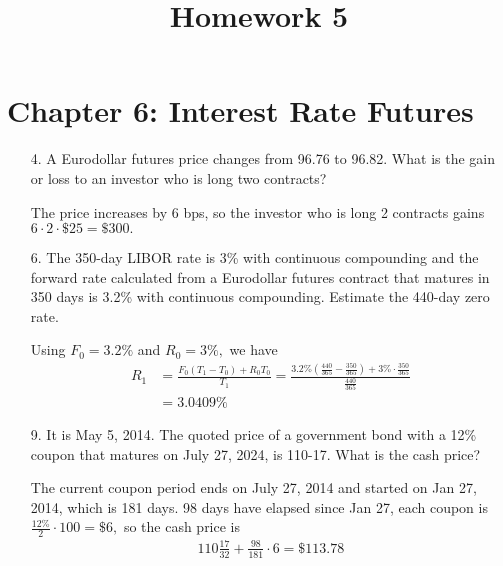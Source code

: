 \documentclass{article}
\begin{document}
\title{Homework 5}
\maketitle
\thispagestyle{fancy}

\section*{Chapter 6: Interest Rate Futures}

\begin{itemize}
	\item[4.] A Eurodollar futures price changes from 96.76 to 96.82. What is the gain or loss to an investor who is long two contracts?
		\begin{soln}
			The price increases by 6 bps, so the investor who is long 2 contracts gains $6\cdot 2\cdot \$25 = \$300.$
		\end{soln}

	\item[6.] The 350-day LIBOR rate is 3\% with continuous compounding and the forward rate calculated from a Eurodollar futures contract that matures in 350 days is 3.2\% with continuous compounding. Estimate the 440-day zero rate.
		\begin{soln}
			Using $F_0=3.2\%$ and $R_0=3\%,$ we have
			\begin{align*}
				R_{1} &= \frac{F_0(T_{1}-T_0)+R_0T_0}{T_{1}} = \frac{3.2\%\left( \frac{440}{365}-\frac{350}{365} \right) + 3\%\cdot \frac{350}{365}}{\frac{440}{365}} \\
				&= 3.0409\%
			\end{align*}
		\end{soln}

	\item[9.] It is May 5, 2014. The quoted price of a government bond with a 12\% coupon that matures on July 27, 2024, is 110-17. What is the cash price?
		\begin{soln}
			The current coupon period ends on July 27, 2014 and started on Jan 27, 2014, which is 181 days. 98 days have elapsed since Jan 27, each coupon is $\frac{12\%}{2}\cdot 100 = \$6,$ so the cash price is
			\begin{align*}
				110\frac{17}{32} + \frac{98}{181}\cdot 6 = \$113.78
			\end{align*}
		\end{soln}


\end{itemize}
\end{document}
